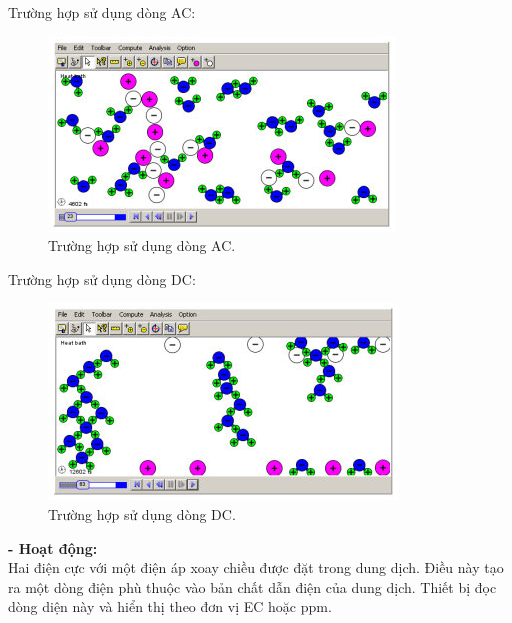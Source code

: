 \documentclass[a4paper,12pt,oneside]{article}
\begin{document}
Trường hợp sử dụng dòng AC:
\begin{figure}[H]
\centering
\begin{center}
\includegraphics[scale=1]{hinh/PPM/ppm_AC.png}
\end{center}
\caption{Trường hợp sử dụng dòng AC.}
\end{figure}

Trường hợp sử dụng dòng DC:
\begin{figure}[H]
\centering
\begin{center}
\includegraphics[scale=1]{hinh/PPM/ppm_DC.png}
\end{center}
\caption{Trường hợp sử dụng dòng DC.}
\end{figure}

\textbf{- Hoạt động:}\\
Hai điện cực với một điện áp xoay chiều được đặt trong dung dịch. Điều này tạo ra một dòng điện phù thuộc vào bản chất dẫn điện của dung dịch. Thiết bị đọc dòng diện này và hiển thị theo đơn vị EC hoặc ppm.\\
\end{document}
